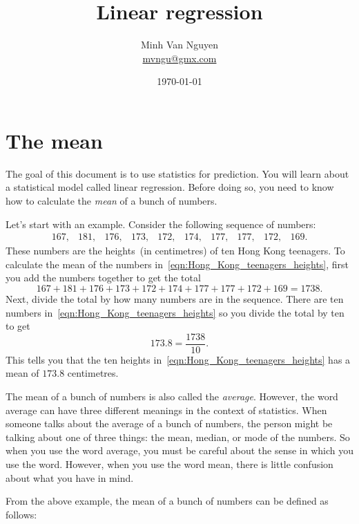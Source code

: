 \documentclass[a4paper,oneside,12pt]{article}
\begin{document}
\title{\Large\bf Linear regression}
\author{%
  Minh Van Nguyen \\
  \url{mvngu@gmx.com}
}
\date{\today}
\maketitle



\section{The mean}
\label{sec:mean}

The goal of this document is to use statistics for prediction.  You
will learn about a statistical model called linear regression.  Before
doing so, you need to know how to calculate the \emph{mean} of a bunch
of numbers.

Let's start with an example.  Consider the following sequence of
numbers:
\begin{equation}
\label{eqn:Hong_Kong_teenagers_heights}
\begin{matrix}
167, & 181, & 176, & 173, & 172, & 174, & 177, & 177, & 172, & 169.
\end{matrix}
\end{equation}
These numbers are the heights~(in centimetres) of ten Hong Kong
teenagers.  To calculate the mean of the numbers
in~\eqref{eqn:Hong_Kong_teenagers_heights}, first you add the numbers
together to get the total
\[
167 + 181 + 176 + 173 + 172 + 174 + 177 + 177 + 172 + 169
=
1738.
\]
Next, divide the total by how many numbers are in the sequence.  There
are ten numbers in~\eqref{eqn:Hong_Kong_teenagers_heights} so you
divide the total by ten to get
\[
173.8
=
\frac{1738}{10}.
\]
This tells you that the ten heights
in~\eqref{eqn:Hong_Kong_teenagers_heights} has a mean of $173.8$
centimetres.

The mean of a bunch of numbers is also called the \emph{average}.
However, the word average can have three different meanings in the
context of statistics.  When someone talks about the average of a
bunch of numbers, the person might be talking about one of three
things: the mean, median, or mode of the numbers.  So when you use the
word average, you must be careful about the sense in which you use the
word.  However, when you use the word mean, there is little confusion
about what you have in mind.

From the above example, the mean of a bunch of numbers can be defined
as follows:
\end{document}
